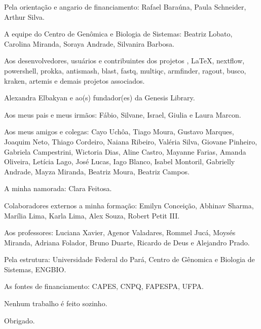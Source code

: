 \begin{agradecimentos}
Pela orientação e angario de financiamento: Rafael Baraúna, Paula Schneider, Arthur Silva. 

A equipe do Centro de Genômica e Biologia de Sistemas: Beatriz Lobato, Carolina Miranda, Soraya Andrade,
Silvanira Barbosa. 

Aos desenvolvedores, usuários e contribuintes dos projetos \abnTeX, \LaTeX, nextflow, powershell, 
prokka, antismash, blast, fastq, multiqc, armfinder, ragout, busco, kraken, artemis e demais projetos
associados.

Alexandra Elbakyan e ao(s) fundador(es) da Genesis Library.

Aos meus pais e meus irmãos: Fábio, Silvane, Israel, Giulia e Laura Marcon.

Aos meus amigos e colegas: Cayo Uchôa, Tiago Moura, Gustavo Marques, Joaquim Neto, Thiago Cordeiro, Naiana Ribeiro, 
Valéria Silva, Giovane Pinheiro, Gabriela Campestrini, Wictoria Dias, Aline Castro, Mayanne Farias, Amanda Oliveira, 
Letícia Lago, José Lucas, Iago Blanco, Isabel Montoril, Gabrielly Andrade, Mayza Miranda,
Beatriz Moura, Beatriz Campos. 

A minha namorada: Clara Feitosa.

Colaboradores externos a minha formação: Emilyn Conceição, Abhinav Sharma, Marília Lima, Karla Lima, Alex Souza, Robert Petit III.

Aos professores: Luciana Xavier, Agenor Valadares, Rommel Jucá, Moysés Miranda, Adriana Folador,
Bruno Duarte, Ricardo de Deus e Alejandro Prado.

Pela estrutura: Universidade Federal do Pará, Centro de Gênomica e Biologia de Sistemas, ENGBIO.

As fontes de financiamento: CAPES, CNPQ, FAPESPA, UFPA.


Nenhum trabalho é feito sozinho.


Obrigado.

\end{agradecimentos}

